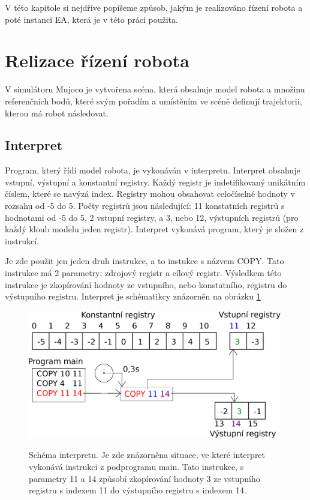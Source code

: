 
V této kapitole si nejdříve popíšeme způsob, jakým je realizováno řízení robota a poté instanci EA, která je v této práci použita.


\section{Relizace řízení robota}
V simulátoru Mujoco je vytvořena scéna, která obsahuje model robota a množinu referenčních bodů, které svým pořadím a umístěním ve scéně definují trajektorii, kterou má robot následovat.

\subsection{Interpret}
Program, který řídí model robota, je vykonáván v interpretu.
Interpret obsahuje vstupní, výstupní a konstantní registry.
Každý registr je indetifikovaný unikátním číslem, které se navýzá index.
Registry mohou obsahovat celočíselné hodnoty v rozsahu od -5 do 5.
Počty registrů jsou následující: 11 konstatních registrů s hodnotami od -5 do 5, 2 vstupní registry, a 3, nebo 12, výstupních registrů (pro každý kloub modelu jeden registr).
Interpret vykonává program, který je složen z instrukcí.

Je zde použit jen jeden druh instrukce, a to instukce s názvem COPY.
Tato instrukce má 2 parametry: zdrojový registr a cílový registr.
Výsledkem této instrukce je zkopírování hodnoty ze vstupního, nebo konstatního, registru do výstupního registru.
Interpret je schématikcy znázorněn na obrázku \ref{fig:interpret}

\begin{figure}[h]
    \centering
    {\includegraphics[width=30em]{obrazky-figures/interpret.eps}}
    \caption{
    Schéma interpretu.
    Je zde znázorněna situace, ve které interpret vykonává instrukci z podprogramu main.
    Tato instrukce, s parametry 11 a 14 způsobí zkopírování hodnoty 3 ze vstupního registru s indexem 11 do výstupního registru s indexem 14.
    }
    \label{fig:interpret}
\end{figure}

